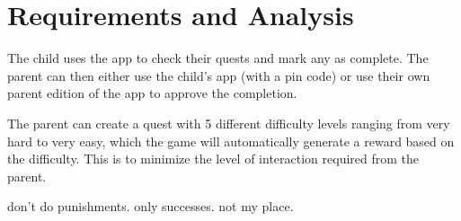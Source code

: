 \chapter{Requirements and Analysis}
\label{chap:methodology}

The child uses the app to check their quests and mark any as complete. 
The parent can then either use the child’s app (with a pin code) or use their own parent edition of the app to approve the completion.

The parent can create a quest with 5 different difficulty levels ranging from very hard to very easy, which the game will automatically generate a reward based on the difficulty. 
This is to minimize the level of interaction required from the parent.

don’t do punishments. only successes. not my place.